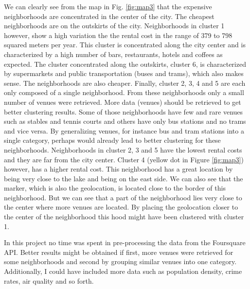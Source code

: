 \documentclass[a4paper,12pt,english]{article}
\begin{document}
We can clearly see from the map in Fig. \ref{fig:map3} that the expensive neighborhoods are concentrated in the center of the city. The cheapest neighborhoods are on the outskirts of the city. Neighborhoods in cluster 1 however, show a high variation the the rental cost in the range of 379 to 798 squared meters per year. This cluster is concentrated along the city center and is characterized by a high number of bars, restaurants, hotels and coffees as expected. The cluster concentrated along the outskirts, cluster 6, is characterized by supermarkets and public transportation (buses and trams), which also makes sense. The neighborhoods are also cheaper. Finally, cluster 2, 3, 4 and 5 are each only composed of a single neighborhood. From these neighborhoods only a small number of venues were retrieved. More data (venues) should be retrieved to get better clustering results. Some of those neighborhoods have few and rare venues such as stables and tennis courts and others have only bus stations and no trams and vice versa. By generalizing venues, for instance bus and tram stations into a single category, perhaps would already lead to better clustering for these neighborhoods. Neighborhoods in cluster 2, 3 and 5 have the lowest rental costs and they are far from the city center. Cluster 4 (yellow dot in Figure \ref{fig:map3}) however, has a higher rental cost. This neighborhood has a great location by being very close to the lake and being on the east side. We can also see that the marker, which is also the geolocation, is located close to the border of this neighborhood. But we can see that a part of the neighborhood lies very close to the center where more venues are located. By placing the geolocation closer to the center of the neighborhood this hood might have been clustered with cluster 1.  \par
In this project no time was spent in pre-processing the data from the Foursquare API. Better results might be obtained if first, more venues were retrieved for some neighborhoods and second by grouping similar venues into one category. Additionally, I could have included more data such as population density, crime rates, air quality and so forth.
\end{document}
